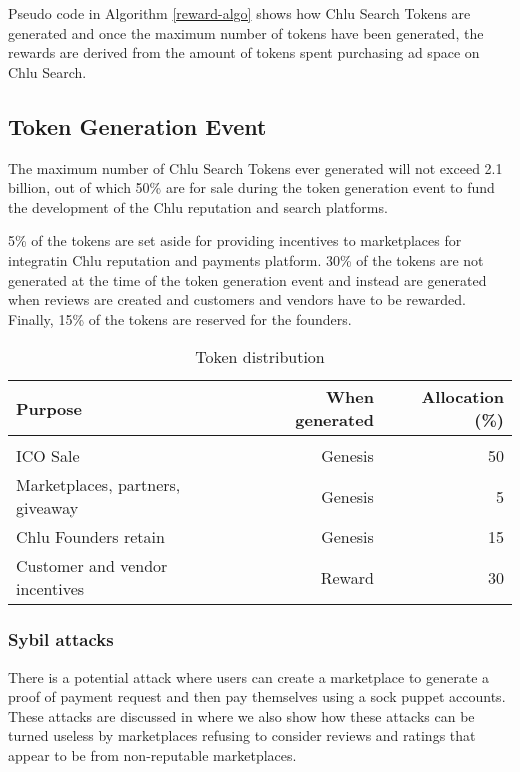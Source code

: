 \documentclass[a4paper]{article}
\begin{document}
Pseudo code in Algorithm \ref{reward-algo} shows how Chlu Search Tokens
are generated and once the maximum number of tokens have been
generated, the rewards are derived from the amount of tokens spent
purchasing ad space on Chlu Search.

\subsection{Token Generation Event}

The maximum number of Chlu Search Tokens ever generated will not
exceed 2.1 billion, out of which 50\% are for sale during the token
generation event to fund the development of the Chlu reputation and
search platforms.

5\% of the tokens are set aside for providing incentives to
marketplaces for integratin Chlu reputation and payments
platform. 30\% of the tokens are not generated at the time of the
token generation event and instead are generated when reviews are
created and customers and vendors have to be rewarded. Finally, 15\%
of the tokens are reserved for the founders.

\begin{center}
  \begin{table}
    \begin{tabular}{l r r}
      \textbf{Purpose} & \textbf{When generated} & \textbf{Allocation (\%)} \\
      \hline \\
      ICO Sale & Genesis & 50 \\
      Marketplaces, partners, giveaway  & Genesis & 5 \\
      Chlu Founders retain & Genesis & 15 \\
      Customer and vendor incentives & Reward & 30
    \end{tabular}
    \caption{Token distribution}
  \end{table}
\end{center}

\subsubsection{Sybil attacks}

There is a potential attack where users can create a marketplace to
generate a proof of payment request and then pay themselves using a
sock puppet accounts. These attacks are discussed in
\cite{chlu-reputation} where we also show how these attacks can be
turned useless by marketplaces refusing to consider reviews and
ratings that appear to be from non-reputable marketplaces.
\end{document}
